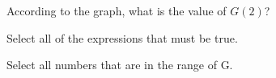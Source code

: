 \documentclass{ximera}
\begin{document}
\begin{exercise}
According to the graph, what is the value of $G(2)$?

\begin{multipleChoice}
\end{multipleChoice}

\end{exercise}




\begin{exercise}
Select all of the expressions that must be true. 

\begin{selectAll}
\end{selectAll}

\end{exercise}





\begin{exercise}
Select all numbers that are in the range of G.

\begin{selectAll}
\end{selectAll}

\end{exercise}
\end{document}

